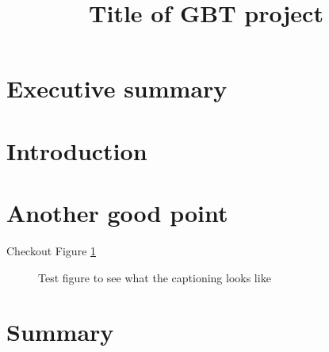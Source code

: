 \documentclass[12pt]{gbt-proposal}
\title{Title of GBT project}
\begin{document}

\section*{Executive summary} 

\lipsum[10]

\section*{Introduction}

\lipsum[20]

\section*{Another good point}

\lipsum[5]

Checkout Figure \ref{fig:testfig}

\begin{figure}[h]
    \centering
    \caption{Test figure to see what the captioning looks like}
    \label{fig:testfig}
\end{figure}

\section*{Summary}




\end{document}
